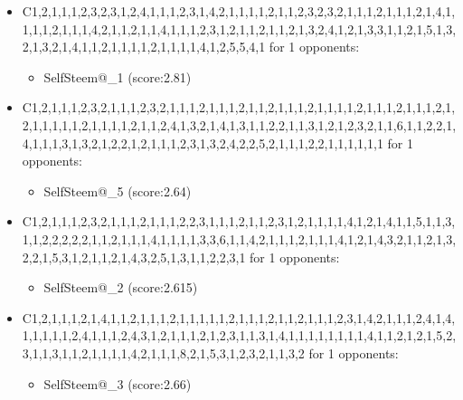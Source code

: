 \begin{appendices}
\begin{itemize}
        \item C1,2,1,1,1,2,3,2,3,1,2,4,1,1,1,2,3,1,4,2,1,1,1,1,2,1,1,2,3,2,3,2,1,1,1,2,1,1,1,2,1,4,1,1,1,1,2,1,1,1,4,2,1,1,2,1,1,4,1,1,1,2,3,1,2,1,1,2,1,1,2,1,3,2,4,1,2,1,3,3,1,1,2,1,5,1,3,2,1,3,2,1,4,1,1,2,1,1,1,1,2,1,1,1,1,4,1,2,5,5,4,1 for 1 opponents:
        \begin{multicols}{3}
            \begin{itemize}
                \item SelfSteem@\_1 (score:2.81)
            \end{itemize}
        \end{multicols}

        \item C1,2,1,1,1,2,3,2,1,1,1,2,3,2,1,1,1,2,1,1,1,2,1,1,2,1,1,1,2,1,1,1,1,2,1,1,1,2,1,1,1,2,1,2,1,1,1,1,1,2,1,1,1,1,2,1,1,2,4,1,3,2,1,4,1,3,1,1,2,2,1,1,3,1,2,1,2,3,2,1,1,6,1,1,2,2,1,4,1,1,1,3,1,3,2,1,2,2,1,2,1,1,1,2,3,1,3,2,4,2,2,5,2,1,1,1,2,2,1,1,1,1,1,1 for 1 opponents:
        \begin{multicols}{3}
            \begin{itemize}
                \item SelfSteem@\_5 (score:2.64)
            \end{itemize}
        \end{multicols}

        \item C1,2,1,1,1,2,3,2,1,1,1,2,1,1,1,2,2,3,1,1,1,2,1,1,2,3,1,2,1,1,1,1,4,1,2,1,4,1,1,5,1,1,3,1,1,2,2,2,2,2,1,1,2,1,1,1,4,1,1,1,1,3,3,6,1,1,4,2,1,1,1,2,1,1,1,4,1,2,1,4,3,2,1,1,2,1,3,2,2,1,5,3,1,2,1,1,2,1,4,3,2,5,1,3,1,1,2,2,3,1 for 1 opponents:
        \begin{multicols}{3}
            \begin{itemize}
                \item SelfSteem@\_2 (score:2.615)
            \end{itemize}
        \end{multicols}

        \item C1,2,1,1,1,2,1,4,1,1,2,1,1,1,2,1,1,1,1,1,2,1,1,1,2,1,1,2,1,1,1,2,3,1,4,2,1,1,1,2,4,1,4,1,1,1,1,1,2,4,1,1,1,2,4,3,1,2,1,1,1,2,1,2,3,1,1,3,1,4,1,1,1,1,1,1,1,1,4,1,1,2,1,2,1,5,2,3,1,1,3,1,1,2,1,1,1,1,4,2,1,1,1,8,2,1,5,3,1,2,3,2,1,1,3,2 for 1 opponents:
        \begin{multicols}{3}
            \begin{itemize}
                \item SelfSteem@\_3 (score:2.66)
            \end{itemize}
        \end{multicols}


\end{itemize}
\end{appendices}
